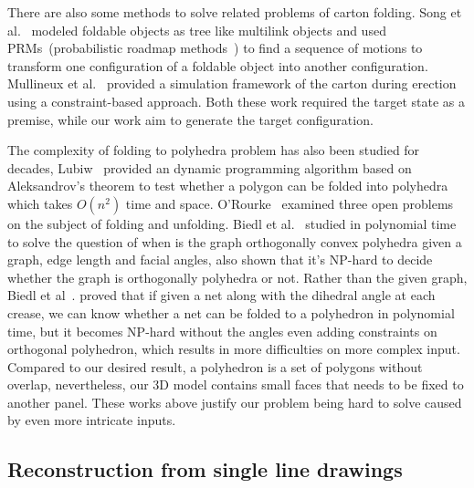 There are also some methods to solve related problems of carton folding. 
Song et al.~\cite{Song:2000:MPA:892954} modeled foldable objects as tree like multilink objects and used PRMs~(probabilistic roadmap methods~\cite{Kavraki:1994:PRP:891758}) to find a sequence of motions to transform one configuration of a foldable object into another configuration. 
Mullineux et al.~\cite{Mullineux:2010:CSC:1739328.1739673} provided a simulation framework of the carton during erection using a constraint-based approach. Both these work required the target state as a premise, while our work aim to generate the target configuration.

The complexity of folding to polyhedra problem has also been studied for decades, Lubiw~\cite{Lubiw1996When} provided an dynamic programming algorithm based on Aleksandrov's theorem to test whether a polygon can be folded into polyhedra which takes $O(n^2)$ time and space. 
O'Rourke~\cite{O'Rourke:1998:FUC:646319.686376} examined three open problems on the subject of folding and unfolding. 
Biedl et al.~\cite{Biedl2004When} studied in polynomial time to solve the question of when is the graph orthogonally convex polyhedra given a graph, edge length and facial angles, also shown that it's NP-hard to decide whether the graph is orthogonally polyhedra or not. Rather than the given graph, Biedl et al~\cite{Biedl:2005:NFP:1090462.1646553}. proved that if given a net along with the dihedral angle at each crease, we can know whether a net can be folded to a polyhedron in polynomial time, but it becomes NP-hard without the angles even adding constraints on orthogonal polyhedron, which results in more difficulties on more complex input.
Compared to our desired result, a polyhedron is a set of polygons without overlap, nevertheless, our 3D model contains small faces that needs to be fixed to another panel. 
These works above justify our problem being hard to solve caused by even more intricate inputs.

\subsection{Reconstruction from single line drawings}

